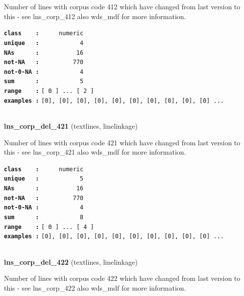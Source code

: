 \documentclass[]{article}
\begin{document}
Number of lines with corpus code 412 which have changed from last
version to this - see lns\_corp\_412 also wds\_mdf for more information.

\textbf{\texttt{class\ \ \ \ :}} \texttt{~~~~~numeric}\\
\textbf{\texttt{unique\ \ \ :}} \texttt{~~~~~~~~~~~4}\\
\textbf{\texttt{NAs\ \ \ \ \ \ :}} \texttt{~~~~~~~~~~16}\\
\textbf{\texttt{not-NA\ \ \ :}} \texttt{~~~~~~~~~770}\\
\textbf{\texttt{not-0-NA\ :}} \texttt{~~~~~~~~~~~4}\\
\textbf{\texttt{sum\ \ \ \ \ \ :}} \texttt{~~~~~~~~~~~5}\\
\textbf{\texttt{range\ \ \ \ :}}
\texttt{{[}\ 0\ {]}\ ...\ {[}\ 2\ {]}}\\
\textbf{\texttt{examples\ :}}
\texttt{{[}0{]},\ {[}0{]},\ {[}0{]},\ {[}0{]},\ {[}0{]},\ {[}0{]},\ {[}0{]},\ {[}0{]},\ {[}0{]},\ {[}0{]}\ ...}\\

~

\textbf{lns\_corp\_del\_421} (textlines, linelinkage)

Number of lines with corpus code 421 which have changed from last
version to this - see lns\_corp\_421 also wds\_mdf for more information.

\textbf{\texttt{class\ \ \ \ :}} \texttt{~~~~~numeric}\\
\textbf{\texttt{unique\ \ \ :}} \texttt{~~~~~~~~~~~5}\\
\textbf{\texttt{NAs\ \ \ \ \ \ :}} \texttt{~~~~~~~~~~16}\\
\textbf{\texttt{not-NA\ \ \ :}} \texttt{~~~~~~~~~770}\\
\textbf{\texttt{not-0-NA\ :}} \texttt{~~~~~~~~~~~4}\\
\textbf{\texttt{sum\ \ \ \ \ \ :}} \texttt{~~~~~~~~~~~8}\\
\textbf{\texttt{range\ \ \ \ :}}
\texttt{{[}\ 0\ {]}\ ...\ {[}\ 4\ {]}}\\
\textbf{\texttt{examples\ :}}
\texttt{{[}0{]},\ {[}0{]},\ {[}0{]},\ {[}0{]},\ {[}0{]},\ {[}0{]},\ {[}0{]},\ {[}0{]},\ {[}0{]},\ {[}0{]}\ ...}\\

~

\textbf{lns\_corp\_del\_422} (textlines, linelinkage)

Number of lines with corpus code 422 which have changed from last
version to this - see lns\_corp\_422 also wds\_mdf for more information.
\end{document}
